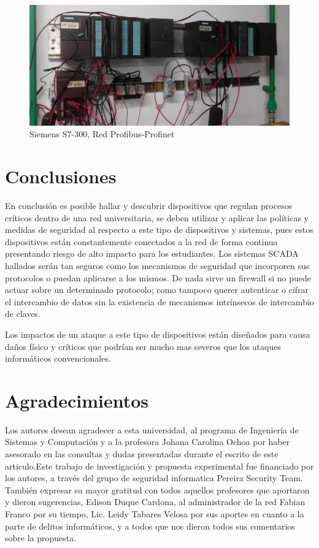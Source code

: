 \documentclass[jou,apacite]{apa6}
\begin{document}
\begin{figure}[htb]
\centering
\includegraphics[scale=0.2]{images/f7s73002.jpg}
\caption{Siemens S7-300, Red Profibus-Profinet} \label{fig:s73002}
\end{figure}

\section{Conclusiones }
En conclusión es posible hallar y descubrir dispositivos que regulan procesos críticos dentro de una red universitaria, se deben utilizar y aplicar las políticas y medidas de seguridad al respecto a este tipo de dispositivos y sistemas, pues estos dispositivos están constantemente conectados a la red de forma continua presentando riesgo de alto impacto para los estudiantes. Los sistemas SCADA hallados serán tan seguros como los  mecanismos de seguridad que incorporen sus protocolos o puedan aplicarse a los mismos. De nada sirve un firewall si no puede actuar sobre un determinado protocolo; como tampoco querer autenticar o cifrar el intercambio de datos sin la existencia de mecanismos intrínsecos de intercambio de claves.

Los impactos de un ataque a este tipo de dispositivos están diseñados para causa daños físico y críticos que podrían ser mucho mas severos que los ataques informáticos convencionales.
\newpage
\section{Agradecimientos }
Los autores desean agradecer a esta universidad, al programa de Ingeniería de Sistemas y Computación y a la profesora Johana Carolina Ochoa por haber asesorado en las consultas y dudas presentadas durante el escrito de este articulo.Este trabajo de investigación y propuesta experimental fue financiado por los autores, a través del grupo de seguridad informatica Pereira Security Team. También expresar su mayor gratitud con todos aquellos profesores que aportaron y dieron sugerencias, Edison Duque Cardona, al administrador de la red Fabian Franco por su tiempo, Lic. Leidy Tabares Velosa por sus aportes en cuanto a la parte de delitos informáticos, y a todos que nos dieron todos sus comentarios sobre la propuesta. 



\end{document}
